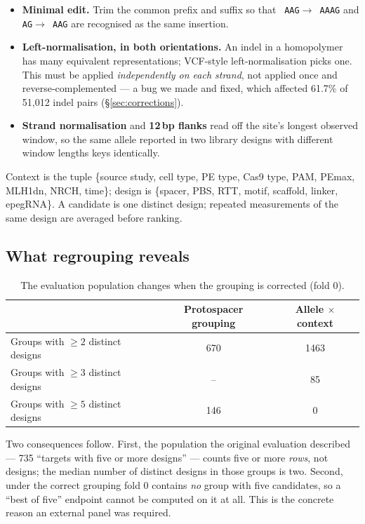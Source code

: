 \documentclass[11pt]{article}
\newcommand{\code}[1]{\texttt{\small\begingroup\hyphenpenalty=10000 #1\endgroup}}
\begin{document}
\begin{itemize}\itemsep2pt
\item \textbf{Minimal edit.} Trim the common prefix and suffix so that
\code{AAG}$\rightarrow$\code{AAAG} and \code{AG}$\rightarrow$\code{AAG} are recognised as the
same insertion.
\item \textbf{Left-normalisation, in both orientations.} An indel in a homopolymer has many
equivalent representations; VCF-style left-normalisation picks one. This must be applied
\emph{independently on each strand}, not applied once and reverse-complemented --- a bug we
made and fixed, which affected 61.7\% of 51{,}012 indel pairs (\S\ref{sec:corrections}).
\item \textbf{Strand normalisation} and \textbf{12\,bp flanks} read off the site's longest
observed window, so the same allele reported in two library designs with different window
lengths keys identically.
\end{itemize}

Context is the tuple \{source study, cell type, PE type, Cas9 type, PAM, PEmax, MLH1dn, NRCH,
time\}; design is \{spacer, PBS, RTT, motif, scaffold, linker, epegRNA\}. A candidate is one
distinct design; repeated measurements of the same design are averaged before ranking.

\subsection{What regrouping reveals}

\begin{table}[htbp]\centering\footnotesize
\caption{The evaluation population changes when the grouping is corrected (fold 0).}
\label{tab:grouping}
\begin{tabular}{l S[table-format=4.0] S[table-format=4.0]}
\toprule
& {Protospacer grouping} & {Allele $\times$ context} \\
\midrule
Groups with $\geq 2$ distinct designs & 670 & 1463 \\
Groups with $\geq 3$ distinct designs & {--} & 85 \\
Groups with $\geq 5$ distinct designs & 146 & 0 \\
\bottomrule
\end{tabular}
\end{table}

Two consequences follow. First, the population the original evaluation described --- 735
``targets with five or more designs'' --- counts five or more \emph{rows}, not designs; the
median number of distinct designs in those groups is two. Second, under the correct grouping
fold 0 contains \emph{no} group with five candidates, so a ``best of five'' endpoint cannot be
computed on it at all. This is the concrete reason an external panel was required.
\end{document}
